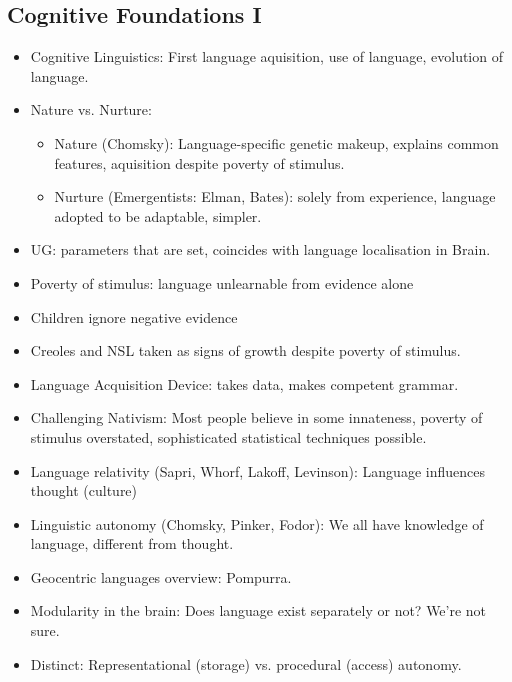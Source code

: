 \documentclass[11pt]{article}
\newenvironment{itemise}{
\begin{itemize}
  \setlength{\itemsep}{1pt}
  \setlength{\parskip}{0pt}
  \setlength{\parsep}{0pt}
}{\end{itemize}}
\begin{document}
\subsection{Cognitive Foundations I}
\begin{itemise}
 \item Cognitive Linguistics: First language aquisition, use of language, evolution of language.
 \item Nature vs. Nurture:
 \begin{itemise}
	\item Nature (Chomsky): Language-specific genetic makeup, explains common features, aquisition despite poverty of stimulus.
	\item Nurture (Emergentists: Elman, Bates): solely from experience, language adopted to be adaptable, simpler.
 \end{itemise}
 \item UG: parameters that are set, coincides with language localisation in Brain.
 \item Poverty of stimulus: language unlearnable from evidence alone
 \item Children ignore negative evidence
 \item Creoles and NSL taken as signs of growth despite poverty of stimulus.
 \item Language Acquisition Device: takes data, makes competent grammar.
 \item Challenging Nativism: Most people believe in some innateness, poverty of stimulus overstated, sophisticated statistical techniques possible.
 \item Language relativity (Sapri, Whorf, Lakoff, Levinson): Language influences thought (culture)
 \item Linguistic autonomy (Chomsky, Pinker, Fodor): We all have knowledge of language, different from thought.
 \item Geocentric languages overview: Pompurra.
 \item Modularity in the brain: Does language exist separately or not? We're not sure.
 \item Distinct: Representational (storage) vs. procedural (access)  autonomy. 
\end{itemise}


%
%
\end{document}

